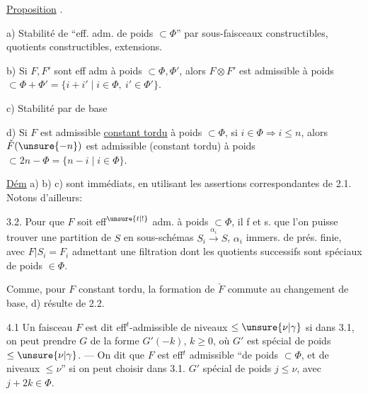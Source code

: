 

\uline{Proposition} .

a) Stabilité de ``eff. adm. de poids $\subset\Phi$'' par sous-faisceaux constructibles, quotients constructibles,  extensions.

b) Si $F,F'$ sont eff adm à poids $\subset\Phi,\Phi'$, alors $F\otimes F'$ est admissible à poids $\subset\Phi+\Phi'=\{i+i'\mid i\in\Phi,\ i'\in\Phi'\}$.

c) Stabilité par  de base

d) Si $F$ est  admissible \uline{constant tordu} à poids $\subset\Phi$,  si $i\in\Phi\Rightarrow i\leq n$, alors $\check F(\unsure{-n})$ est  admissible (constant tordu) à poids $\subset2n-\Phi=\{n-i\mid i\in\Phi\}$.


\uline{Dém} a) b) c) sont immédiats, en utilisant les assertions correspondantes de 2.1. Notons d'ailleurs:

3.2.  Pour que $F$ soit eff$^{\unsure{t|!}}$ adm. à poids $\subset\Phi$, il f et s. que l'on puisse trouver une partition de $S$ en  sous-schémas $S_i\xrightarrow{\alpha_i}S$, $\alpha_i$ immers. de prés. finie, avec  $F|S_i=F_i$ admettant une filtration dont les quotients successifs sont spéciaux de poids $\in\Phi$.


Comme, pour $F$ constant tordu, la formation de $\check F$ commute au changement de base,  d) résulte de 2.2.


4.1 Un faisceau $F$ est dit eff$^{t}$-admissible de niveaux $\leq\unsure{\nu|\gamma}$ si  dans 3.1, on peut prendre $G$  de la forme $G'(-k)$, $k\geq0$, où $G'$ est spécial de poids  $\leq\unsure{\nu|\gamma}$. --- On dit que $F$ est eff$^{t}$ admissible ``de poids $\subset\Phi$, et de niveaux $\leq\nu$'' si on peut choisir dans 3.1. $G'$  spécial de poids $j\leq\nu$, avec  $j+2k\in\Phi$.

